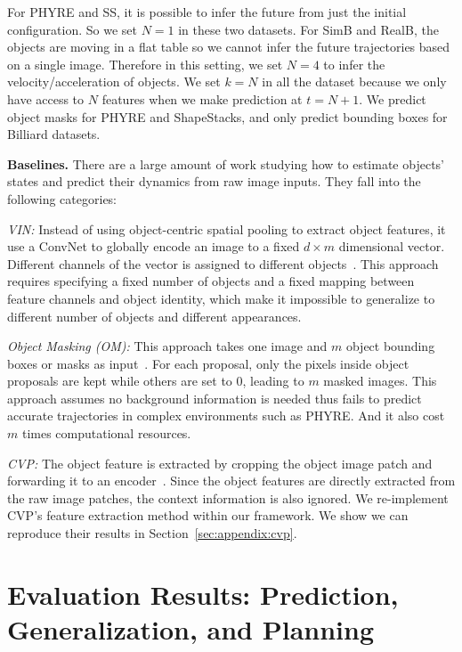 \documentclass{article} \usepackage{iclr2021_conference,times}
\newcommand{\numobj}{m}
\newcommand{\featdim}{d}
\begin{document}
For PHYRE and SS, it is possible to infer the future from just the initial configuration. So we set $N=1$ in these two datasets. For SimB and RealB, the objects are moving in a flat table so we cannot infer the future trajectories based on a single image. Therefore in this setting, we set $N=4$ to infer the velocity/acceleration of objects. We set $k=N$ in all the dataset because we only have access to $N$ features when we make prediction at $t=N+1$. We predict object masks for PHYRE and ShapeStacks, and only predict bounding boxes for Billiard datasets. 

\textbf{Baselines.} There are a large amount of work studying how to estimate objects' states and predict their dynamics from raw image inputs. They fall into the following categories:

\textit{VIN:} Instead of using object-centric spatial pooling to extract object features, it use a ConvNet to globally encode an image to a fixed $\featdim \times \numobj$ dimensional vector. Different channels of the vector is assigned to different objects~\citep{kipf2019contrastive, watters2017visual}. This approach requires specifying a fixed number of objects and a fixed mapping between feature channels and object identity, which make it impossible to generalize to different number of objects and different appearances.

\textit{Object Masking (OM):} This approach takes one image and $\numobj$ object bounding boxes or masks as input~\citep{wu2017learning,veerapaneni2019entity,janner2018reasoning}. For each proposal, only the pixels inside object proposals are kept while others are set to $0$, leading to $\numobj$ masked images. This approach assumes no background information is needed thus fails to predict accurate trajectories in complex environments such as PHYRE. And it also cost $\numobj$ times computational resources.

\textit{CVP:} The object feature is extracted by cropping the object image patch and forwarding it to an encoder~\citep{ye2019cvp,yi2019clevrer}. Since the object features are directly extracted from the raw image patches, the context information is also ignored. We re-implement CVP's feature extraction method within our framework. We show we can reproduce their results in Section~\ref{sec:appendix:cvp}.

\vspace{-0.75em}
\section{Evaluation Results: Prediction, Generalization, and Planning}
\label{sec:exp}
\vspace{-0.75em}
\end{document}
